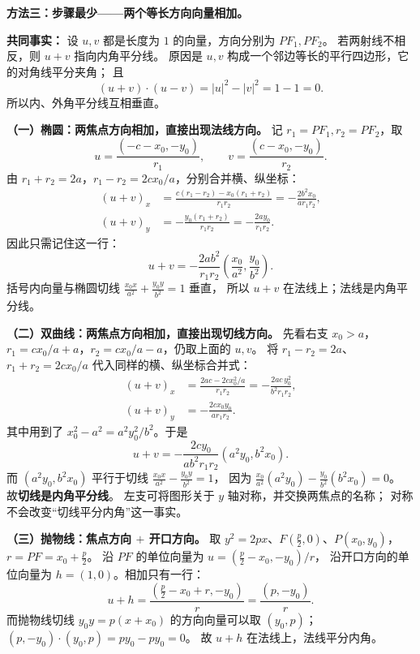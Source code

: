 \begin{proofbox}
\textbf{方法三：步骤最少——两个等长方向向量相加。}
\begin{center}\end{center}
\textbf{共同事实：} 设 $u,v$ 都是长度为 $1$ 的向量，方向分别为 $PF_1,PF_2$。
若两射线不相反，则 $u+v$ 指向内角平分线。
原因是 $u,v$ 构成一个邻边等长的平行四边形，它的对角线平分夹角；
且
\[
(u+v)\cdot(u-v)=|u|^2-|v|^2=1-1=0.
\]
所以内、外角平分线互相垂直。

\textbf{（一）椭圆：两焦点方向相加，直接出现法线方向。}
记 $r_1=PF_1,r_2=PF_2$，取
\[
u=\frac{(-c-x_0,-y_0)}{r_1},\qquad
v=\frac{(c-x_0,-y_0)}{r_2}.
\]
由 $r_1+r_2=2a$，$r_1-r_2=2cx_0/a$，分别合并横、纵坐标：
\[
\begin{aligned}
(u+v)_x
&=\frac{c(r_1-r_2)-x_0(r_1+r_2)}{r_1r_2}
=-\frac{2b^2x_0}{ar_1r_2},\\
(u+v)_y
&=-\frac{y_0(r_1+r_2)}{r_1r_2}
=-\frac{2ay_0}{r_1r_2}.
\end{aligned}
\]
因此只需记住这一行：
\[
\boxed{u+v=-\frac{2ab^2}{r_1r_2}
\left(\frac{x_0}{a^2},\frac{y_0}{b^2}\right)}.
\]
括号内向量与椭圆切线
$\tfrac{x_0x}{a^2}+\tfrac{y_0y}{b^2}=1$ 垂直，
所以 $u+v$ 在法线上；法线是内角平分线。

\textbf{（二）双曲线：两焦点方向相加，直接出现切线方向。}
先看右支 $x_0>a$，
$r_1=cx_0/a+a$，$r_2=cx_0/a-a$，仍取上面的 $u,v$。
将 $r_1-r_2=2a$、$r_1+r_2=2cx_0/a$ 代入同样的横、纵坐标合并式：
\[
\begin{aligned}
(u+v)_x
&=\frac{2ac-2cx_0^2/a}{r_1r_2}
=-\frac{2ac\,y_0^2}{b^2r_1r_2},\\
(u+v)_y
&=-\frac{2cx_0y_0}{ar_1r_2}.
\end{aligned}
\]
其中用到了 $x_0^2-a^2=a^2y_0^2/b^2$。于是
\[
\boxed{u+v=-\frac{2cy_0}{ab^2r_1r_2}
(a^2y_0,b^2x_0)}.
\]
而 $(a^2y_0,b^2x_0)$ 平行于切线
$\tfrac{x_0x}{a^2}-\tfrac{y_0y}{b^2}=1$，
因为
$\tfrac{x_0}{a^2}(a^2y_0)-\tfrac{y_0}{b^2}(b^2x_0)=0$。
故\textbf{切线是内角平分线}。
左支可将图形关于 $y$ 轴对称，并交换两焦点的名称；
对称不会改变“切线平分内角”这一事实。

\textbf{（三）抛物线：焦点方向 $+$ 开口方向。}
取 $y^2=2px$、$F(\tfrac p2,0)$、$P(x_0,y_0)$，
$r=PF=x_0+\tfrac p2$。
沿 $PF$ 的单位向量为 $u=(\tfrac p2-x_0,-y_0)/r$，
沿开口方向的单位向量为 $h=(1,0)$。相加只有一行：
\[
\boxed{u+h
=\frac{(\tfrac p2-x_0+r,-y_0)}r
=\frac{(p,-y_0)}r}.
\]
而抛物线切线 $y_0y=p(x+x_0)$ 的方向向量可以取 $(y_0,p)$；
$(p,-y_0)\cdot(y_0,p)=py_0-py_0=0$。
故 $u+h$ 在法线上，法线平分内角。

\medskip\noindent
\end{proofbox}
